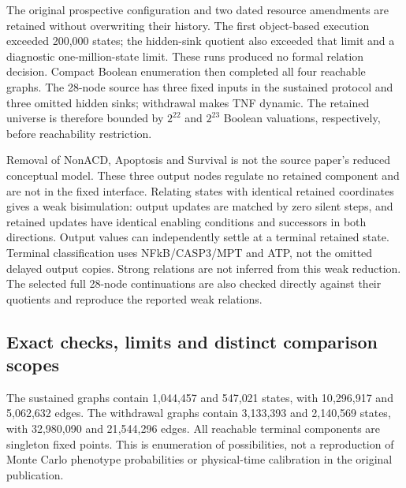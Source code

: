 \documentclass{ws-jbcb}
\numberwithin{equation}{section}
\newcommand{\DRBaseMinusEdges}{5{,}062{,}632}
\newcommand{\DRBaseMinusStates}{547{,}021}
\newcommand{\DRBasePlusEdges}{10{,}296{,}917}
\newcommand{\DRBasePlusStates}{1{,}044{,}457}
\newcommand{\DRControlMinusEdges}{21{,}544{,}296}
\newcommand{\DRControlMinusStates}{2{,}140{,}569}
\newcommand{\DRControlPlusEdges}{32{,}980{,}090}
\newcommand{\DRControlPlusStates}{3{,}133{,}393}
\begin{document}
The original prospective configuration and two dated resource amendments are
retained without overwriting their history. The first object-based execution
exceeded 200,000 states; the hidden-sink quotient also exceeded that limit and
a diagnostic one-million-state limit. These runs produced no formal relation
decision. Compact Boolean enumeration then completed all four reachable
graphs. The 28-node source has three fixed inputs in the sustained protocol
and three omitted hidden sinks; withdrawal makes TNF dynamic. The retained
universe is therefore bounded by $2^{22}$ and $2^{23}$ Boolean valuations,
respectively, before reachability restriction.

Removal of NonACD, Apoptosis and Survival is not the source paper's reduced
conceptual model. These three output nodes regulate no retained component and
are not in the fixed interface. Relating states with identical retained
coordinates gives a weak bisimulation: output updates are matched by zero
silent steps, and retained updates have identical enabling conditions and
successors in both directions. Output values can independently settle at a
terminal retained state. Terminal classification uses NFkB/CASP3/MPT and ATP,
not the omitted delayed output copies. Strong relations are not inferred from
this weak reduction. The selected full 28-node continuations are also checked
directly against their quotients and reproduce the reported weak relations.

\subsection{Exact checks, limits and distinct comparison scopes}

The sustained graphs contain \DRBasePlusStates{} and \DRBaseMinusStates{}
states, with \DRBasePlusEdges{} and \DRBaseMinusEdges{} edges. The withdrawal
graphs contain \DRControlPlusStates{} and \DRControlMinusStates{} states,
with \DRControlPlusEdges{} and \DRControlMinusEdges{} edges. All reachable
terminal components are singleton fixed points. This is enumeration of
possibilities, not a reproduction of Monte Carlo phenotype probabilities or
physical-time calibration in the original publication.
\end{document}
